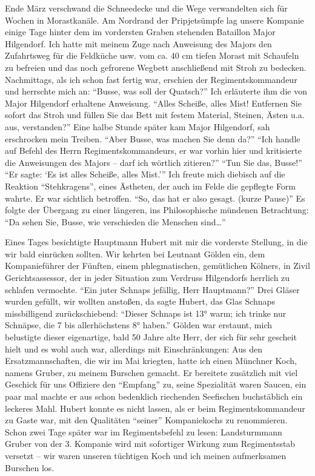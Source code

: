 \documentclass[a5paper,pagesize,10pt,twoside=true]{scrbook}
\begin{document}
Ende März verschwand die Schneedecke und die Wege verwandelten sich für Wochen in Morastkanäle. Am Nordrand der Pripjetsümpfe lag unsere Kompanie einige Tage hinter dem im vordersten Graben stehenden Bataillon Major Hilgendorf. Ich hatte mit meinem Zuge nach Anweisung des Majors den Zufahrtsweg für die Feldküche usw. vom ca. 40 cm tiefen Morast mit Schaufeln zu befreien und das noch gefrorene Wegbett anschließend mit Stroh zu bedecken. Nachmittags, als ich schon fast fertig war, erschien der Regimentskommandeur und herrschte mich an: \enquote{Busse, was soll der Quatsch?} Ich erläuterte ihm die von Major Hilgendorf erhaltene Anweisung. \enquote{Alles Scheiße, alles Mist! Entfernen Sie sofort das Stroh und füllen Sie das Bett mit festem Material, Steinen, Ästen u.a. aus, verstanden?} Eine halbe Stunde später kam Major Hilgendorf, sah erschrocken mein Treiben. \enquote{Aber Busse, was machen Sie denn da?} \enquote{Ich handle auf Befehl des Herrn Regimentskommandeurs, er war vorhin hier und kritisierte die Anweisungen des Majors -- darf ich wörtlich zitieren?} \enquote{Tun Sie das, Busse!} \enquote{Er sagte: \enquote{Es ist alles Scheiße, alles Mist.}} Ich freute mich diebisch auf die Reaktion \enquote{Stehkragens}, eines Ästheten, der auch im Felde die gepflegte Form wahrte. Er war sichtlich betroffen. \enquote{So, das hat er also gesagt. (kurze Pause)} Es folgte der Übergang zu einer längeren, ins Philosophische mündenen Betrachtung: \enquote{Da sehen Sie, Busse, wie verschieden die Menschen sind\dots}

Eines Tages besichtigte Hauptmann Hubert mit mir die vorderste Stellung, in die wir bald einrücken sollten. Wir kehrten bei Leutnant Gölden ein, dem Kompanieführer der Fünften, einem phlegmatischen, gemütlichen Kölners, in Zivil Gerichtsassessor, der in jeder Situation zum Verdruss Hilgendorfs herrlich zu schlafen vermochte. \enquote{Ein juter Schnaps jefällig, Herr Hauptmann?} Drei Gläser wurden gefüllt, wir wollten anstoßen, da sagte Hubert, das Glas Schnaps missbilligend zurückschiebend: \enquote{Dieser Schnaps ist 13° warm; ich trinke nur Schnäpse, die 7 bis allerhöchstens 8° haben.} Gölden war erstaunt, mich belustigte dieser eigenartige, bald 50 Jahre alte Herr, der sich für sehr gescheit hielt und es wohl auch war, allerdings mit Einschränkungen: Aus den Ersatzmannschaften, die wir im Mai kriegten, hatte ich einen Münchner Koch, namens Gruber, zu meinem Burschen gemacht. Er bereitete zusätzlich mit viel Geschick für uns Offiziere den \enquote{Empfang} zu, seine Spezialität waren Saucen, ein paar mal machte er aus schon bedenklich riechenden Seefischen buchstäblich ein leckeres Mahl. Hubert konnte es nicht lassen, als er beim Regimentskommandeur zu Gaste war, mit den Qualitäten \enquote{seiner} Kompaniekochs zu renommieren. Schon zwei Tage später war im Regimentsbefehl zu lesen: Landsturmmann Gruber von der 3. Kompanie wird mit sofortiger Wirkung zum Regimentsstab versetzt -- wir waren unseren tüchtigen Koch und ich meinen aufmerksamen Burschen los.
\end{document}
